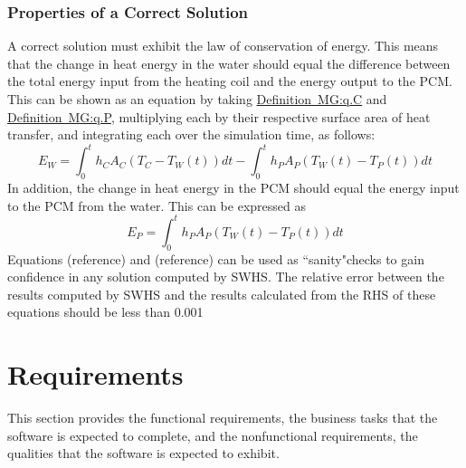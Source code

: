 \documentclass[12pt]{article}
\begin{document}
\subsubsection{Properties of a Correct Solution}
\label{Sec:PoaCS}
A correct solution must exhibit the law of conservation of energy. This means that the change in heat energy in the water should equal the difference between  the total energy input from the heating coil and the energy output to the PCM. This can be shown as an equation by taking \hyperref[MG:q.C]{Definition~MG:q.C} and \hyperref[MG:q.P]{Definition~MG:q.P}, multiplying each by their respective surface area of heat transfer, and integrating each over the simulation time, as follows:
\begin{equation}
E_{W}=\int_{0}^{t}{h_{C}A_{C}(T_{C}-T_{W}(t))dt}-\int_{0}^{t}{h_{P}A_{P}(T_{W}(t)-T_{P}(t))dt}
\end{equation}
In addition, the change in heat energy in the PCM should equal the energy input to the PCM from the water. This can be expressed as
\begin{equation}
E_{P}=\int_{0}^{t}{h_{P}A_{P}(T_{W}(t)-T_{P}(t))dt}
\end{equation}
Equations (reference) and (reference) can be used as ``sanity"checks to gain confidence in any solution computed by SWHS. The relative error between the results computed by SWHS and the results calculated from the RHS of these equations should be less than 0.001%
\section{Requirements}
\label{Sec:Rs}
This section provides the functional requirements, the business tasks that the software is expected to complete, and the nonfunctional requirements, the qualities that the software is expected to exhibit.
\end{document}
